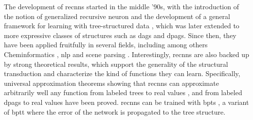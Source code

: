 The development of \glspl{recnn} started in the middle '90s, with the introduction of the notion of generalized recursive neuron \citep{sperduti1997generalizedneuron} and the development of a general framework for learning with tree-structured data \citep{frasconi1998general}, which was later extended to more expressive classes of structures such as \glspl{dag} and \glspl{dpag}. Since then, they have been applied fruitfully in several fields, including among others Cheminformatics \citep{micheli2007introductionrecnncheminformatics,baldi2013recursiveneuralnets}, \gls{nlp} \citep{costa2000recnns,costa2003recnns,sturt2003recnns,socher2013recnnsentiment} and scene parsing \citep{socher2011parsingscenes}. Interestingly, \glspl{recnn} are also backed up by strong theoretical results, which support the generality of the structural transduction and characterize the kind of functions they can learn. Specifically, universal approximation theorems showing that \glspl{recnn} can approximate arbitrarily well any function from labeled trees to real values \citep{hammer1999recnn}, and from labeled \glspl{dpag} to real values \citep{hammer2005universal} have been proved. \glspl{recnn} can be trained with \gls{bpts} \cite{goller1996backpropstructure}, a variant of \gls{bptt} where the error of the network is propagated to the tree structure.

